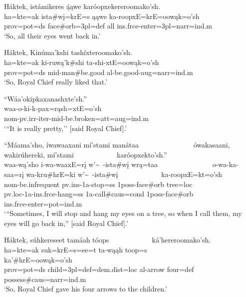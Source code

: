 \begin{exe}
\item\label{EJ33} \glll Háktek, istámikeres ą́ąwe karóopxekereroomako'sh.\\
ha=kte=ak ista\#wį=krE=s ąąwe ka-roopxE=krE=oowąk=o'sh\\
prov=pot=ds \textnormal{face}\#\textnormal{orb}=3pl=def \textnormal{all} ins.frce-\textnormal{enter}=3pl=narr=ind.m\\
\glt `So, all their eyes went back in.'

\item\label{EJ34} \glll Háktek, Kinúma'kshi tashíxteroomako'sh.\\
ha=kte=ak ki-ruwą'k\#shi ta-shi-xtE=oowąk=o'sh\\
prov=pot=ds mid-\textnormal{man}\#\textnormal{be.good} al-\textnormal{be.good}-aug=narr=ind.m\\
\glt `So, Royal Chief really liked that.'

\item\label{EJ35} \glll ``Wáa'okipkaxanashxte'sh.''\\
waa-o-ki-k-pax=rąsh=xtE=o'sh\\
nom-pv.irr-iter-mid-\textnormal{be.broken}=att=aug=ind.m\\
\glt `{``}It is really pretty,'' [said Royal Chief].'

\item\label{EJ36} \glll ``Máama'sho, íwawaaxani mí'stami manátaa ~ ~ ~ ~ ~ ~ ~ ~ ~ ówakasaani, wakirúhereki, mí'stami ~ ~ ~ ~ ~ ~ ~ karóopxekto'sh.''\\
waa-wą'sho i-wa-waaxE=rį w'\~~-ista\#wį wrą=taa ~ ~ ~ ~ ~ ~ ~ ~ ~ o-wa-ka-saa=rį wa-kru\#hrE=ki w'\~~-ista\#wį ~ ~ ~ ~ ~ ~ ~ ka-roopxE=kt=o'sh\\
nom-\textnormal{be.infrequent} pv.ins-1a-\textnormal{stop}=ss 1poss-\textnormal{face}\#\textnormal{orb} \textnormal{tree}=loc ~ ~ ~ ~ ~ ~ ~ ~ ~ pv.loc-1a-ins.frce-\textnormal{hang}=ss 1a-\textnormal{call}\#caus=cond 1poss-\textnormal{face}\#\textnormal{orb} ~ ~ ~ ~ ~ ~ ~ ins.frce-\textnormal{enter}=pot=ind.m\\
\glt `{``}Sometimes, I will stop and hang my eyes on a tree, so when I call them, my eyes will go back in,{''} [said Royal Chief].'

\item\label{EJ37} \glll Háktek, súhkereseet tamáah tóops ~ ~ ~ ~ ~ ~ ~ ká'hereroomako'sh.\\
ha=kte=ak suk=krE=s=ee=t ta-wąąh toop=s ~ ~ ~ ~ ~ ~ ~ ka'\#hrE=oowąk=o'sh\\
prov=pot=ds \textnormal{child}=3pl=def=dem.dist=loc al-\textnormal{arrow} \textnormal{four}=def ~ ~ ~ ~ ~ ~ ~ \textnormal{possess}\#caus=narr=ind.m\\
\glt `So, Royal Chief gave his four arrows to the children.'


\end{exe}
